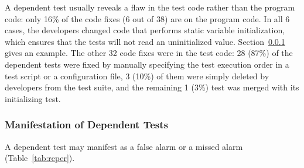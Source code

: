 
A dependent test usually
reveals a flaw in the test code rather than the program code:
only 16\% of the code fixes (6 out of 38) are
on the program code.
In all 6 cases, the developers changed
code that performs static variable initialization, which ensures that
the tests will not read an uninitialized value.
Section~\ref{sec:repercussion} gives an example.
The other 32 code fixes were in the test code:
28 (87\%) of the dependent tests were fixed by manually specifying
the test execution order in a test script or a configuration file,
3 (10\%) of them were simply deleted by developers
from the test suite, and the remaining 1 (3\%) test was merged with its
initializing test.








\subsubsection{Manifestation of Dependent Tests}
\label{sec:repercussion}



A dependent test may manifest as a false alarm or a missed alarm
(Table~\ref{tab:reper}).

\vspace{1mm}

